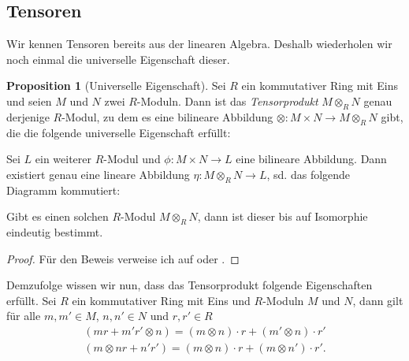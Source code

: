 \documentclass[11pt,titlepage]{article}
\theoremstyle{definition}
\newtheorem{proposition}[theorem]{Proposition}
\theoremstyle{remark}
\begin{document}
	\subsection{Tensoren}
	
	Wir kennen Tensoren bereits aus der linearen Algebra. Deshalb wiederholen wir noch einmal die universelle 
	Eigenschaft dieser.
	
	\begin{proposition}[Universelle Eigenschaft] \label{prop:univeig}
		Sei $R$ ein kommutativer Ring mit Eins und seien $M$ und $N$ zwei $R$-Moduln. Dann ist das 
		\textsl{Tensorprodukt} $M\otimes_R N$ genau derjenige $R$-Modul, zu dem es eine bilineare Abbildung 
		$\otimes: M\times N \to M\otimes_R N$ gibt, die die folgende universelle Eigenschaft erfüllt:
		\begin{center}
			Sei $L$ ein weiterer $R$-Modul und $\phi: M\times N \to L$ eine bilineare Abbildung. Dann 
			existiert genau eine lineare Abbildung $\eta: M\otimes_R N \to L$, sd. das folgende Diagramm 
			kommutiert:
			\begin{center}
			\end{center}
		\end{center}
		Gibt es einen solchen $R$-Modul $M\otimes_R N$, dann ist dieser bis auf Isomorphie eindeutig bestimmt.
	\end{proposition}
	
	\begin{proof}
		Für den Beweis verweise ich auf \cite[Proposition 2.12]{introductiontocomalg} oder \cite[Satz 7.3]{SkriptLA}.
	\end{proof}
	
	Demzufolge wissen wir nun, dass das Tensorprodukt folgende Eigenschaften erfüllt. Sei $R$ ein kommutativer Ring 
	mit Eins und $R$-Moduln $M$ und $N$, dann gilt für alle $m,m'\in M$, $n,n'\in N$ und $r,r'\in R$
	\begin{align*}
		(mr+m'r'\otimes n)=(m\otimes n)\cdot r +(m'\otimes n)\cdot r' \\
		(m\otimes nr+n'r')=(m\otimes n)\cdot r+(m\otimes n')\cdot r'.
	\end{align*}
	
\end{document}
